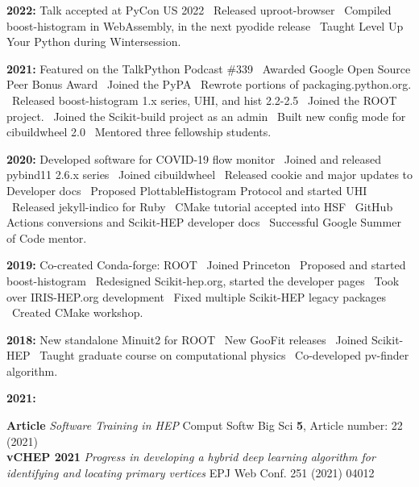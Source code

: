 \documentclass[10pt,letterpaper]{moderncv}
\begin{document}

\textbf{2022:} Talk accepted at PyCon US 2022 \textbullet\
Released uproot-browser \textbullet\
Compiled boost-histogram in WebAssembly, in the next pyodide release \textbullet\
Taught Level Up Your Python during Wintersession.

\textbf{2021:} Featured on the TalkPython Podcast \#339 \textbullet\
Awarded Google Open Source Peer Bonus Award \textbullet\
Joined the PyPA \textbullet\ Rewrote portions of packaging.python.org. \textbullet\
Released boost-histogram 1.x series, UHI, and hist 2.2-2.5 \textbullet\
Joined the ROOT project. \textbullet\
Joined the Scikit-build project as an admin \textbullet\
Built new config mode for cibuildwheel 2.0 \textbullet\
Mentored three fellowship students.

\textbf{2020:} Developed software for COVID-19 flow monitor \textbullet\
Joined and released pybind11 2.6.x series \textbullet\
Joined cibuildwheel \textbullet\
Released cookie and major updates to Developer docs \textbullet\
Proposed PlottableHistogram Protocol and started UHI \textbullet\
Released jekyll-indico for Ruby \textbullet\
CMake tutorial accepted into HSF \textbullet\
GitHub Actions conversions and Scikit-HEP developer docs \textbullet\
Successful Google Summer of Code mentor.

\textbf{2019:} Co-created Conda-forge: ROOT \textbullet\
Joined Princeton \textbullet\
Proposed and started boost-histogram \textbullet\
Redesigned Scikit-hep.org, started the developer pages \textbullet\
Took over IRIS-HEP.org development \textbullet\
Fixed multiple Scikit-HEP legacy packages \textbullet\ Created CMake workshop.

\textbf{2018:} New standalone Minuit2 for ROOT \textbullet\
New GooFit releases \textbullet\
Joined Scikit-HEP \textbullet\
Taught graduate course on computational physics \textbullet\
Co-developed pv-finder algorithm.

\mysection{Selected Publications - peer reviewed}

\begin{minipage}[t]{.065\textwidth}
\textbf{2021:}
\end{minipage}%
\begin{minipage}[t]{.935\textwidth}
\textbf{Article} \emph{Software Training in HEP} Comput Softw Big Sci \textbf{5}, Article number: 22 (2021) \\
\textbf{vCHEP 2021} \emph{Progress in developing a hybrid deep learning algorithm for identifying and locating primary vertices} EPJ Web Conf. 251 (2021) 04012
\end{minipage}
\end{document}
